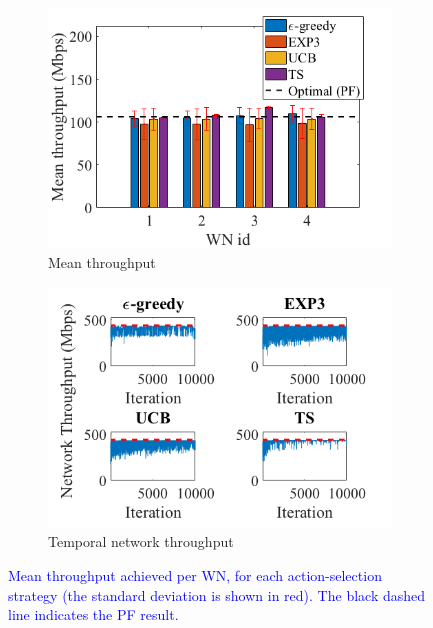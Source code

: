 \documentclass[preprint,12pt]{elsarticle}
\begin{document}
	\begin{figure}[h!]
		\centering
		\begin{subfigure}[b]{0.45\textwidth}
			\includegraphics[width=\textwidth]{images/results_part_1_mean_tpt_default}
			\caption{Mean throughput}
			\label{fig:results_part_1_variability_default}
		\end{subfigure}
		\begin{subfigure}[b]{0.45\textwidth}
			\includegraphics[width=\textwidth]{images/results_part_1_agg_variability_default}
			\caption{Temporal network throughput}
			\label{fig:results_part_1_agg_variability_default}
		\end{subfigure}
		\caption{\textcolor{blue}{Mean throughput achieved per WN, for each action-selection strategy (the standard deviation is shown in red). The black dashed line indicates the PF result.}}
		\label{fig:results_part_1_mean_tpt}
	\end{figure}
	
\end{document}
